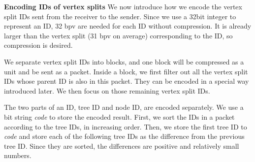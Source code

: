     \textbf{Encoding IDs of vertex splits}
    We now introduce how we encode the vertex split IDs sent from the receiver to the
    sender. Since we use a 32bit integer to represent an ID, 32 bpv are needed for each ID
    without compression. It is already larger than the vertex split (31 bpv on average)
    corresponding to the ID, so compression is desired.
    
    We separate vertex split IDs into blocks, and one block will be compressed as a unit and
    be sent as a packet. Inside a block, we first filter out all the vertex split IDs
    whose parent ID is also in this packet. They can be encoded in a special way introduced
    later. We then focus on those remaining vertex split IDs.
    
    The two parts of an ID, tree ID and node ID, are encoded separately.  
    We use a bit string \textit{code} to store the encoded result.
    First, we sort the IDs in a packet according to the tree IDs, in increasing order. 
    Then, we store the first tree ID to \textit{code} and 
    store each of the following tree IDs as the difference from the previous tree ID.
    Since they are sorted, the differences are positive and relatively small numbers.

